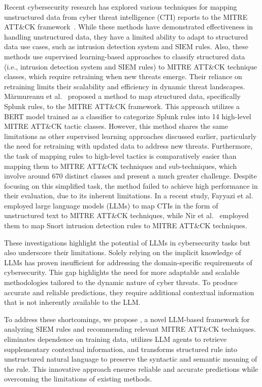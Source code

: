 Recent cybersecurity research has explored various techniques for mapping unstructured data from cyber threat intelligence (CTI) reports to the MITRE ATT\&CK framework~\cite{alves2022leveraging,alam2023looking,rani2024ttpxhunter,liu2022threat,zhang2024attackgboosting}. 
While these methods have demonstrated effectiveness in handling unstructured data, they have a limited ability to adapt to structured data use cases, such as intrusion detection system and SIEM rules.
Also, these methods use supervised learning-based approaches to classify structured data (i.e., intrusion detection system and SIEM rules) to MITRE ATT\&CK technique classes, which require retraining when new threats emerge.
Their reliance on retraining limits their scalability and efficiency in dynamic threat landscapes.
Mărmureanu et al.~\cite{10398612} proposed a method to map structured data, specifically Splunk rules, to the MITRE ATT\&CK framework. 
This approach utilizes a BERT model trained as a classifier to categorize Splunk rules into 14 high-level MITRE ATT\&CK tactic classes. 
However, this method shares the same limitations as other supervised learning approaches discussed earlier, particularly the need for retraining with updated data to address new threats. 
Furthermore, the task of mapping rules to high-level tactics is comparatively easier than mapping them to MITRE ATT\&CK techniques and sub-techniques, which involve around 670 distinct classes and present a much greater challenge. 
Despite focusing on this simplified task, the method failed to achieve high performance in their evaluation, due to its inherent limitations.
In a recent study, Fayyazi et al.~\cite{fayyazi2023advancing} employed large language models (LLMs) to map CTIs in the form of unstructured text to MITRE ATT\&CK techniques, while Nir et al.~\cite{daniel2023labeling} employed them to map Snort intrusion detection rules to MITRE ATT\&CK techniques. 

These investigations highlight the potential of LLMs in cybersecurity tasks but also underscore their limitations. 
Solely relying on the implicit knowledge of LLMs has proven insufficient for addressing the domain-specific requirements of cybersecurity.
This gap highlights the need for more adaptable and scalable methodologies tailored to the dynamic nature of cyber threats.
To produce accurate and reliable predictions, they require additional contextual information that is not inherently available to the LLM.

To address these shortcomings, we propose \methodName, a novel LLM-based framework for analyzing SIEM rules and recommending relevant MITRE ATT\&CK techniques. 
\methodName eliminates dependence on training data, utilizes LLM agents to retrieve supplementary contextual information, and transforms structured rule into unstructured natural language to preserve the syntactic and semantic meaning of the rule.
This innovative approach ensures reliable and accurate predictions while overcoming the limitations of existing methods.

